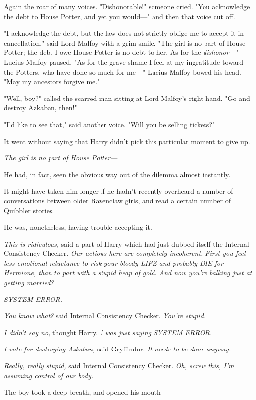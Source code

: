 Again the roar of many voices. "Dishonorable!" someone cried. "You acknowledge
the debt to House Potter, and yet you would---" and then that voice cut off.

"I acknowledge the debt, but the law does not strictly oblige me to accept it
in cancellation," said Lord Malfoy with a grim smile. "The girl is no part of
House Potter; the debt I owe House Potter is no debt to her. As for the
\emph{dishonor}---" Lucius Malfoy paused. "As for the grave shame I feel at my
ingratitude toward the Potters, who have done so much for me---" Lucius Malfoy
bowed his head. "May my ancestors forgive me."

"Well, boy?" called the scarred man sitting at Lord Malfoy's right hand. "Go
and destroy Azkaban, then!"

"I'd like to see that," said another voice. "Will you be selling tickets?"

It went without saying that Harry didn't pick this particular moment to give up.

\emph{The girl is no part of House Potter---}

He had, in fact, seen the obvious way out of the dilemma almost instantly.

It might have taken him longer if he hadn't recently overheard a number of
conversations between older Ravenclaw girls, and read a certain number of
Quibbler stories.

He was, nonetheless, having trouble accepting it.

\emph{This is ridiculous,} said a part of Harry which had just dubbed itself
the Internal Consistency Checker. \emph{Our actions here are completely
incoherent. First you feel less emotional reluctance to risk your bloody LIFE
and probably DIE for Hermione, than to part with a stupid heap of gold. And now
you're balking just at getting married?}

\emph{SYSTEM ERROR.}

\emph{You know what?} said Internal Consistency Checker. \emph{You're stupid.}

\emph{I didn't say no,} thought Harry. \emph{I was just saying SYSTEM ERROR.}

\emph{I vote for destroying Azkaban,} said Gryffindor. \emph{It needs to be
done anyway.}

\emph{Really, really stupid,} said Internal Consistency Checker. \emph{Oh,
screw this, I'm assuming control of our body.}

The boy took a deep breath, and opened his mouth---

